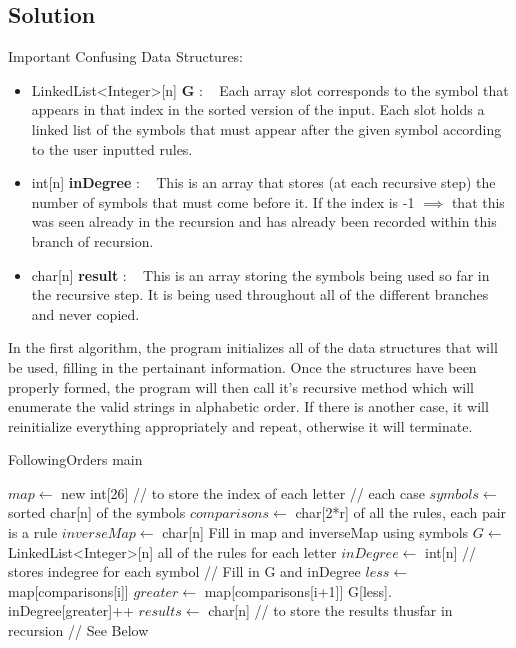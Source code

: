 \documentclass[12pt]{article}
\begin{document}

\subsection{Solution}
Important Confusing Data Structures:
\begin{itemize}
    \item LinkedList\textless Integer\textgreater [n] \textbf{G} : ~ Each array slot corresponds to the symbol that appears in
        that index in the sorted version of the input. Each slot holds a linked list of the symbols that must appear
        after the given symbol according to the user inputted rules.
    \item int[n] \textbf{inDegree} : ~ This is an array that stores (at each recursive step) the number of symbols that must come
        before it. If the index is -1 $\implies$ that this was seen already in the recursion and has already been recorded
        within this branch of recursion.
    \item char[n] \textbf{result} : ~ This is an array storing the symbols being used so far in the recursive step. It is being
        used throughout all of the different branches and never copied.
\end{itemize}
In the first algorithm, the program initializes all of the data structures that will be used, filling in the pertainant
information. Once the structures have been properly formed, the program will then call it's recursive method which will
enumerate the valid strings in alphabetic order. If there is another case, it will reinitialize everything appropriately
and repeat, otherwise it will terminate.

\begin{algorithm}[H]
\caption{FollowingOrders main}
\begin{algorithmic}
        \State $map \gets$ new int[26] // to store the index of each letter
            // each case
            \State $symbols \gets$ sorted char[n] of the symbols
            \State $comparisons \gets$ char[2*r] of all the rules, each pair is a rule
            \State $inverseMap \gets$ char[n]
                \State Fill in map and inverseMap using symbols
            \EndFor
            \State $G \gets$ LinkedList\textless Integer\textgreater [n] all of the rules for each letter
            \State $inDegree \gets$ int[n] // stores indegree for each symbol
            \State // Fill in G and inDegree
                \State $less \gets$ map[comparisons[i]]
                \State $greater \gets$ map[comparisons[i+1]]
                \State G[less].
                \State inDegree[greater]++
            \EndFor
            \State $results \gets$ char[n] // to store the results thusfar in recursion
            \State {} // See Below
        \EndWhile
    \EndProcedure
\end{algorithmic}
\end{algorithm}
\end{document}

